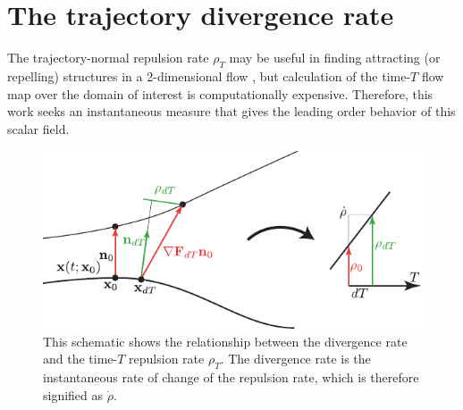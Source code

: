 \documentclass[twocolumn]{svjour3}
\begin{document}
\section{The trajectory divergence rate}\label{s:Derivation}
The trajectory-normal repulsion rate \(\rho_T\) may be useful in finding attracting (or repelling) structures in a 2-dimensional flow \cite{haller_variational_2011}, but calculation of the time-$T$ flow map over the domain of interest is computationally expensive. Therefore, this work seeks an instantaneous measure that gives the leading order behavior of this scalar field.

\begin{figure}
\centering
\includegraphics[width=4.5in]{Fig2}
\caption{This schematic shows the relationship between the divergence rate and the time-$T$ repulsion rate $\rho_T$. The divergence rate is the instantaneous rate of change of the repulsion rate, which is therefore signified as $\dot{\rho}$.}
\label{fig:div-rate-schematic}
\end{figure}
\end{document}
